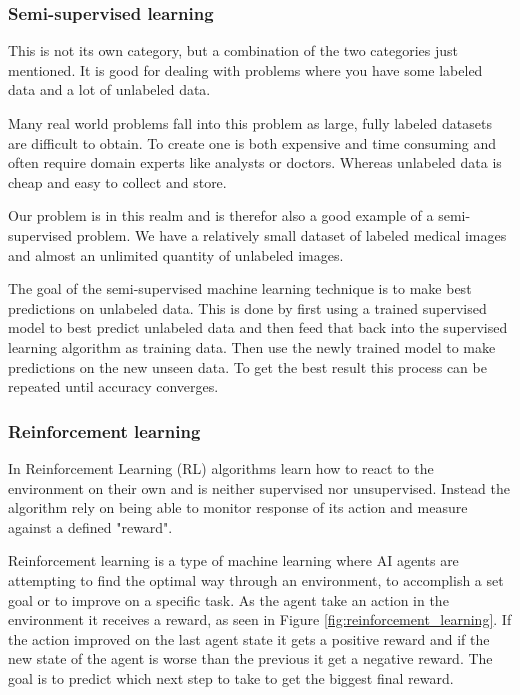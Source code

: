 \documentclass[thesis.tex]{subfiles}
\begin{document}
\subsubsection{Semi-supervised learning} \label{semi_supervised_learning}
This is not its own category, but a combination of the two categories just mentioned. It is good for dealing with problems where you have some labeled data and a lot of unlabeled data.

Many real world problems fall into this problem as large, fully labeled datasets are difficult to obtain. To create one is both expensive and time consuming and often require domain experts like analysts or doctors. Whereas unlabeled data is cheap and easy to collect and store.

Our problem is in this realm and is therefor also a good example of a semi-supervised problem. We have a relatively small dataset of labeled medical images and almost an unlimited quantity of unlabeled images.

The goal of the semi-supervised machine learning technique is to make best predictions on unlabeled data. This is done by first using a trained supervised model to best predict unlabeled data and then feed that back into the supervised learning algorithm as training data. Then use the newly trained model to make predictions on the new unseen data. To get the best result this process can be repeated until accuracy converges.



\subsubsection{Reinforcement learning} \label{sec:reinforcement learning}
In Reinforcement Learning (RL) algorithms learn how to react to the environment on their own and is neither supervised nor unsupervised. Instead the algorithm rely on being able to monitor response of its action and measure against a defined "reward".

Reinforcement learning is a type of machine learning where AI agents are attempting to find the optimal way through an environment, to accomplish a set goal or to improve on a specific task. As the agent take an action in the environment it receives a reward, as seen in Figure \ref{fig:reinforcement_learning}. If the action improved on the last agent state it gets a positive reward and if the new state of the agent is worse than the previous it get a negative reward. The goal is to predict which next step to take to get the biggest final reward.
\end{document}
